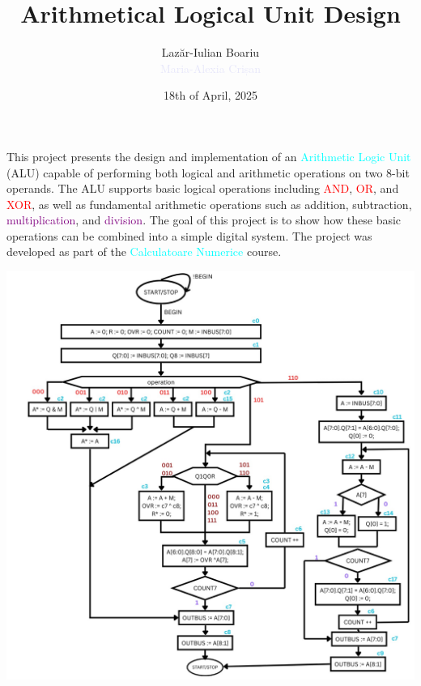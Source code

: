 \documentclass[12pt, letterpaper]{article}
\title{\color{BlueGreen}\textbf{Arithmetical Logical Unit Design}}
\author{
\textcolor{OliveGreen}{Laz\u{a}r-Iulian Boariu} \\
\textcolor{Lavender}{Maria-Alexia Crișan}
                                        }
\date{18th of April, 2025}
\begin{document}
\maketitle

\newpage

\tableofcontents

\newpage


This project presents the design and implementation of an \textcolor{cyan}{Arithmetic Logic Unit} (ALU)
capable of performing both logical and arithmetic operations on two 8-bit operands. The ALU supports basic logical operations including
\textcolor{red}{AND}, \textcolor{red}{OR}, and \textcolor{red}{XOR},
as well as fundamental arithmetic operations such as
\textcolor{BurntOrange}{addition}, \textcolor{BurntOrange}{subtraction}, \textcolor{purple}{multiplication}, and \textcolor{purple}{division}.
The goal of this project is to show how these basic operations can be combined into a simple digital system.
The project was developed as part of the \textcolor{cyan}{Calculatoare Numerice} course.


\begin{center}
\includegraphics[scale=0.3]{Documentation/FSM}
\end{center}
\end{document}
